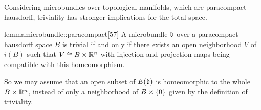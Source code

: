 \begin{myparagraph}
    Considering microbundles over topological manifolds,
    which are paracompact hausdorff,
    triviality has stronger implications for the total space.
\end{myparagraph}

\begin{mystatement}{lemma}{microbundle::paracompact}[57]
    A microbundle $\bb$ over a paracompact hausdorff space $B$ is trivial
    if and only if there exists an open neighborhood $V$ of $i(B)$ such that $V \cong B \times \mathbb{R}^n$
    with injection and projection maps being compatible with this homeomorphism.
\end{mystatement}

\begin{myparagraph}
    So we may assume that an open subset of $E(\bb)$ is homeomorphic to the whole $B \times \mathbb{R}^n$,
    instead of only a neighborhood of $B \times{} \{0\}$ given by the definition of triviality.
\end{myparagraph}

